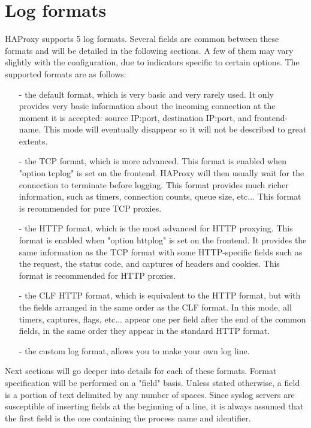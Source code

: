 \section{Log formats}

HAProxy supports 5 log formats. Several fields are common between these formats
and will be detailed in the following sections. A few of them may vary
slightly with the configuration, due to indicators specific to certain
options. The supported formats are as follows:

\begin{itemize}
\item[-] the default format, which is very basic and very rarely used. It only
    provides very basic information about the incoming connection at the moment
    it is accepted: source IP:port, destination IP:port, and frontend-name.
    This mode will eventually disappear so it will not be described to great
    extents.

\item[-] the TCP format, which is more advanced. This format is enabled when "option
    tcplog" is set on the frontend. HAProxy will then usually wait for the
    connection to terminate before logging. This format provides much richer
    information, such as timers, connection counts, queue size, etc... This
    format is recommended for pure TCP proxies.

\item[-] the HTTP format, which is the most advanced for HTTP proxying. This format
    is enabled when "option httplog" is set on the frontend. It provides the
    same information as the TCP format with some HTTP-specific fields such as
    the request, the status code, and captures of headers and cookies. This
    format is recommended for HTTP proxies.

\item[-] the CLF HTTP format, which is equivalent to the HTTP format, but with the
    fields arranged in the same order as the CLF format. In this mode, all
    timers, captures, flags, etc... appear one per field after the end of the
    common fields, in the same order they appear in the standard HTTP format.

\item[-] the custom log format, allows you to make your own log line.
\end{itemize}

Next sections will go deeper into details for each of these formats. Format
specification will be performed on a "field" basis. Unless stated otherwise, a
field is a portion of text delimited by any number of spaces. Since syslog
servers are susceptible of inserting fields at the beginning of a line, it is
always assumed that the first field is the one containing the process name and
identifier.

